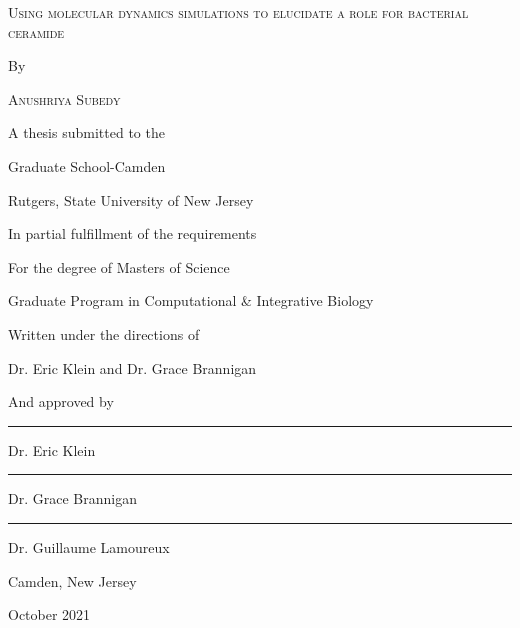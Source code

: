 \documentclass[10pt, letterpaper]{article}
\begin{document}
\renewcommand{\thepage}{\roman{page}}
\begin{titlepage}
	\centering
	{\scshape\large Using molecular dynamics simulations to elucidate a role for bacterial ceramide \par}
	 By \par
	{\scshape\large Anushriya Subedy \par}
	 A thesis submitted to the \par
	 Graduate School-Camden \par
	 Rutgers, State University of New Jersey \par

	 In partial fulfillment of the requirements\par

	 For the degree of Masters of Science\par

	 Graduate Program in Computational \& Integrative Biology\par

	 Written under the directions of\par

	 Dr. Eric Klein and Dr. Grace Brannigan \par

	 And approved by\par
	
	\noindent\rule{8cm}{0.4pt}\par
	Dr. Eric Klein\par
	
	\noindent\rule{8cm}{0.4pt}\par
	Dr. Grace Brannigan \par
	
	\noindent\rule{8cm}{0.4pt}\par
	Dr. Guillaume Lamoureux \par
	
	

	\vfill
	Camden, New Jersey\par
	October 2021\par
\end{titlepage}

\newpage
\end{document}
